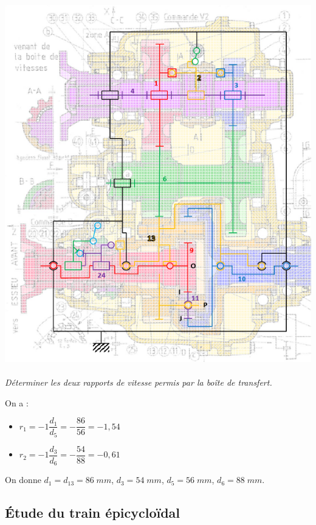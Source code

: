 \documentclass[11pt,oneside]{article}
\begin{document}
\begin{center}
\includegraphics[width=.9\textwidth]{png/schema}
\end{center}

\paragraph{}
\textit{Déterminer les deux rapports de vitesse permis par la boîte de transfert.}

On a :
\begin{itemize}
\item  $r_1 = -1 \dfrac{d_1}{d_5}=-\dfrac{86}{56}=-1,54$
\item  $r_2 = -1 \dfrac{d_3}{d_6}=-\dfrac{54}{88}=-0,61$
\end{itemize}

On donne $d_1 = d_{13} = 86\; mm$, $d_3=54\; mm$, $d_5=56\; mm$, $d_6=88\; mm$.


\subsection{Étude du train épicycloïdal}
\end{document}
